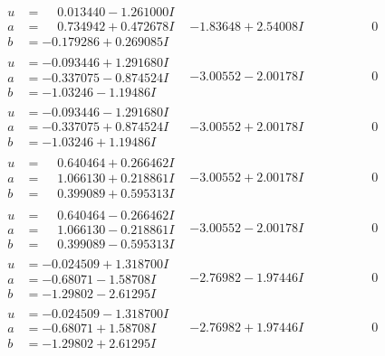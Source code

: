 \documentclass[1p]{elsarticle_modified}
\theoremstyle{definition}
\begin{document}
$$\begin{array}{c|c|c}
\begin{aligned}
u &= \phantom{-}0.013440 - 1.261000 I \\
a &= \phantom{-}0.734942 + 0.472678 I \\
b &= -0.179286 + 0.269085 I\end{aligned}
 & -1.83648 + 2.54008 I & \phantom{-0.000000 } 0 \\ \hline\begin{aligned}
u &= -0.093446 + 1.291680 I \\
a &= -0.337075 - 0.874524 I \\
b &= -1.03246 - 1.19486 I\end{aligned}
 & -3.00552 - 2.00178 I & \phantom{-0.000000 } 0 \\ \hline\begin{aligned}
u &= -0.093446 - 1.291680 I \\
a &= -0.337075 + 0.874524 I \\
b &= -1.03246 + 1.19486 I\end{aligned}
 & -3.00552 + 2.00178 I & \phantom{-0.000000 } 0 \\ \hline\begin{aligned}
u &= \phantom{-}0.640464 + 0.266462 I \\
a &= \phantom{-}1.066130 + 0.218861 I \\
b &= \phantom{-}0.399089 + 0.595313 I\end{aligned}
 & -3.00552 + 2.00178 I & \phantom{-0.000000 } 0 \\ \hline\begin{aligned}
u &= \phantom{-}0.640464 - 0.266462 I \\
a &= \phantom{-}1.066130 - 0.218861 I \\
b &= \phantom{-}0.399089 - 0.595313 I\end{aligned}
 & -3.00552 - 2.00178 I & \phantom{-0.000000 } 0 \\ \hline\begin{aligned}
u &= -0.024509 + 1.318700 I \\
a &= -0.68071 - 1.58708 I \\
b &= -1.29802 - 2.61295 I\end{aligned}
 & -2.76982 - 1.97446 I & \phantom{-0.000000 } 0 \\ \hline\begin{aligned}
u &= -0.024509 - 1.318700 I \\
a &= -0.68071 + 1.58708 I \\
b &= -1.29802 + 2.61295 I\end{aligned}
 & -2.76982 + 1.97446 I & \phantom{-0.000000 } 0 \\ \hline\begin{aligned}

\end{aligned}
\end{array}$$
\end{document}
